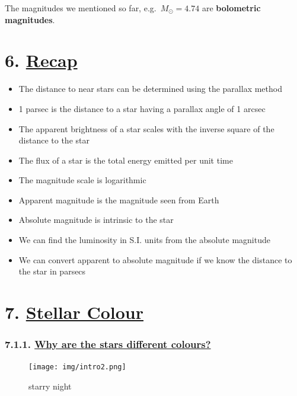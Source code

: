 \documentclass[
  letterpaper,
  DIV=11,
  numbers=noendperiod]{scrreprt}
\begin{document}
The magnitudes we mentioned so far, e.g.~\(M_\odot = 4.74\) are
\textbf{bolometric magnitudes}.

\hypertarget{recap}{%
\chapter{\texorpdfstring{6.
\protect\hyperlink{toc0_}{Recap}}{6. Recap}}\label{recap}}

\begin{itemize}
\item
  The distance to near stars can be determined using the parallax method
\item
  1 parsec is the distance to a star having a parallax angle of 1 arcsec
\item
  The apparent brightness of a star scales with the inverse square of
  the distance to the star
\item
  The flux of a star is the total energy emitted per unit time
\item
  The magnitude scale is logarithmic
\item
  Apparent magnitude is the magnitude seen from Earth
\item
  Absolute magnitude is intrinsic to the star
\item
  We can find the luminosity in S.I. units from the absolute magnitude
\item
  We can convert apparent to absolute magnitude if we know the distance
  to the star in parsecs
\end{itemize}

\hypertarget{stellar-colour}{%
\chapter{\texorpdfstring{7. \protect\hyperlink{toc0_}{Stellar
Colour}}{7. Stellar Colour}}\label{stellar-colour}}

\hypertarget{why-are-the-stars-different-colours}{%
\subsection{\texorpdfstring{7.1.1. \protect\hyperlink{toc0_}{Why are the
stars different
colours?}}{7.1.1. Why are the stars different colours?}}\label{why-are-the-stars-different-colours}}

\begin{figure}

{\centering \texttt{[image: img/intro2.png]}

}

\caption{starry night}

\end{figure}
\end{document}
